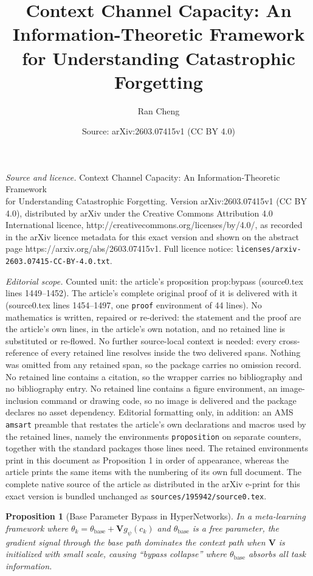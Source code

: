 \documentclass[10pt,a4paper]{amsart}
\title{Context Channel Capacity: An Information-Theoretic Framework\\for Understanding Catastrophic Forgetting}
\author{Ran Cheng}
\date{Source: arXiv:2603.07415v1 (CC BY 4.0)}
\newtheorem{proposition}{Proposition}
\begin{document}
\maketitle

\noindent\emph{Source and licence.} Context Channel Capacity: An Information-Theoretic Framework\\for Understanding Catastrophic Forgetting. Version arXiv:2603.07415v1 (CC BY 4.0), distributed by arXiv under the Creative Commons Attribution 4.0 International licence, http://creativecommons.org/licenses/by/4.0/, as recorded in the arXiv licence metadata for this exact version and shown on the abstract page https://arxiv.org/abs/2603.07415v1. Full licence notice: \texttt{licenses/arxiv-2603.07415-CC-BY-4.0.txt}.\par\smallskip

\noindent\textit{Editorial scope.} Counted unit: the article's proposition prop:bypass (source0.tex lines 1449--1452). The article's complete original proof of it is delivered with it (source0.tex lines 1454--1497, one \texttt{proof} environment of 44 lines). No mathematics is written, repaired or re-derived: the statement and the proof are the article's own lines, in the article's own notation, and no retained line is substituted or re-flowed.  No further source-local context is needed: every cross-reference of every retained line resolves inside the two delivered spans.  Nothing was omitted from any retained span, so the package carries no omission record.  No retained line contains a citation, so the wrapper carries no bibliography and no bibliography entry.  No retained line contains a figure environment, an image-inclusion command or drawing code, so no image is delivered and the package declares no asset dependency.  Editorial formatting only, in addition: an AMS \texttt{amsart} preamble that restates the article's own declarations and macros used by the retained lines, namely the environments \texttt{proposition} on separate counters, together with the standard packages those lines need.  The retained environments print in this document as Proposition 1 in order of appearance, whereas the article prints the same items with the numbering of its own full document.  The complete native source of the article as distributed in the arXiv e-print for this exact version is bundled unchanged as \texttt{sources/195942/source0.tex}.
\begin{proposition}[Base Parameter Bypass in HyperNetworks]
\label{prop:bypass}
In a meta-learning framework where $\theta_k = \theta_\mathrm{base} + \mathbf{V} g_\psi(c_k)$ and $\theta_\mathrm{base}$ is a free parameter, the gradient signal through the base path dominates the context path when $\mathbf{V}$ is initialized with small scale, causing ``bypass collapse'' where $\theta_\mathrm{base}$ absorbs all task information.
\end{proposition}
\end{document}
